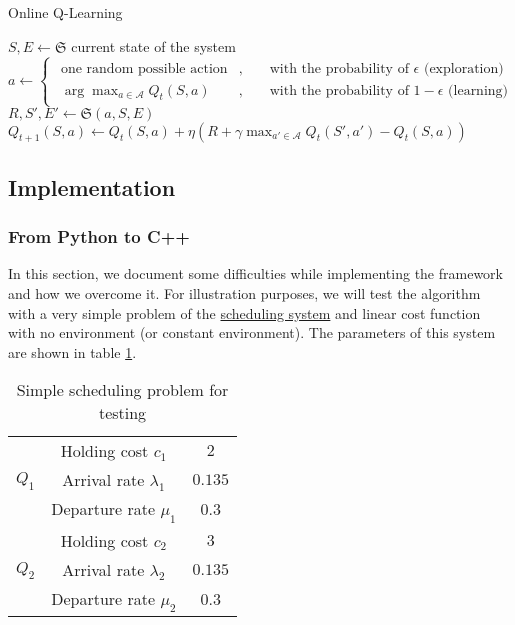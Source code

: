 \documentclass[
  a4paper, xcolor = usenames,dvipsnames]{article}
\theoremstyle{definition}
\theoremstyle{definition}
\theoremstyle{definition}
\theoremstyle{definition}
\theoremstyle{remark}
\begin{document}
\begin{algorithm}
\caption{Online Q-Learning}\label{alg:on-q-learning}
 {
  $S, E \gets \mathfrak{S}$ current state of the system\;
  $a \gets 
    \begin{cases}
    \begin{aligned}
      \text{one random possible action}&, && \text{ with the probability of } \epsilon \text{ (exploration)}\\ 
      \arg\max_{a \in \mathcal{A}} Q_{t}(S, a)&, && \text{ with the probability of } 1 - \epsilon \text{ (learning)}
    \end{aligned}
    \end{cases}
  $\\
  $R, S', E' \gets \mathfrak{S}(a, S, E)$\;
  $Q_{t+1}(S, a) \gets Q_{t}(S, a) + \eta (R + \gamma \max_{a' \in \mathcal{A}} Q_{t}(S', a') - Q_{t}(S, a))$ \;
}
\end{algorithm}

\hypertarget{implementation}{%
\subsection{Implementation}\label{implementation}}

\hypertarget{from-python-to-c}{%
\subsubsection{From Python to C++}\label{from-python-to-c}}

In this section, we document some difficulties while implementing the framework and how we overcome it. For illustration purposes, we will test the algorithm with a very simple problem of the \protect\hyperlink{scheduling-system}{scheduling system}
and linear cost function with no environment (or constant environment). The parameters of this system are shown in table \ref{tab:q-learning-test}.

\begin{table}[!htbp]
\caption{Simple scheduling problem for testing}
\begin{center}
\begin{tabular}{c c c}
    \hline
    \multirow{3}{*}{$Q_{1}$} & Holding cost $c_{1}$ & $2$ \\
    & Arrival rate $\lambda_{1}$ & $0.135$ \\
    & Departure rate $\mu_{1}$ & $0.3$ \\
    \cline{2-3}
    \multirow{3}{*}{$Q_{2}$} & Holding cost $c_{2}$ & $3$ \\
    & Arrival rate $\lambda_{2}$ & $0.135$ \\
    & Departure rate $\mu_{2}$ & $0.3$ \\    
    \hline
\end{tabular}
\end{center}
\label{tab:q-learning-test}
\end{table}
\end{document}
